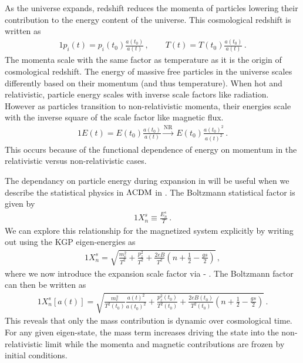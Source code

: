 As the universe expands, redshift reduces the momenta of particles lowering their contribution to the energy content of the universe. This cosmological redshift is written as
\begin{alignat}{1}
  \label{Redshift} p_{i}(t) = p_{i}(t_{0})\frac{a(t_{0})}{a(t)}\,,\qquad T(t) = T(t_{0})\frac{a(t_{0})}{a(t)}\,.
\end{alignat}
The momenta scale with the same factor as temperature as it is the origin of cosmological redshift. The energy of massive free particles in the universe scales differently based on their momentum (and thus temperature). When hot and relativistic, particle energy scales with inverse scale factors like radiation. However as particles transition to non-relativistic momenta, their energies scale with the inverse square of the scale factor like magnetic flux.
\begin{alignat}{1}
    \label{EScale} E(t) = E(t_{0})\frac{a(t_{0})}{a(t)}\xrightarrow{\mathrm{NR}}\  E(t_{0})\frac{a(t_{0})^{2}}{a(t)^{2}}\,.
\end{alignat}
This occurs because of the functional dependence of energy on momentum in the relativistic versus non-relativistic cases.

The dependancy on particle energy during expansion in  will be useful when we describe the statistical physics in $\Lambda{\rm CDM}$ in . The Boltzmann statistical factor is given by
\begin{alignat}{1}
    \label{Boltz} X_{n}^{s}\equiv\frac{E_{n}^{s}}{T}\,.
\end{alignat}
We can explore this relationship for the magnetized system explicitly by writing out  using the KGP eigen-energies as
\begin{alignat}{1}
    \label{XExplicit} X_{n}^{s} = \sqrt{\frac{m_{e}^{2}}{T^{2}}+\frac{p_{z}^{2}}{T^{2}}+\frac{2eB}{T^{2}}\left(n+\frac{1}{2}-\frac{gs}{2}\right)}\,,
\end{alignat}
where we now introduce the expansion scale factor via  - . The Boltzmann factor can then be written as
\begin{alignat}{1}
    \label{XScale} X_{n}^{s}[a(t)] = \sqrt{\frac{m_{e}^{2}}{T^{2}(t_{0})}\frac{a(t)^{2}}{a(t_{0})^{2}}+\frac{p_{z}^{2}(t_{0})}{T^{2}(t_{0})}+\frac{2eB(t_{0})}{T^{2}(t_{0})}\left(n+\frac{1}{2}-\frac{gs}{2}\right)}\,.
\end{alignat}
This reveals that only the mass contribution is dynamic over cosmological time. For any given eigen-state, the mass term increases driving the state into the non-relativistic limit while the momenta and magnetic contributions are frozen by initial conditions. 


